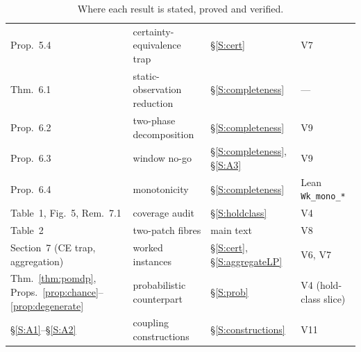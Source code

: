 \begin{table}[htbp]
\begin{tabularx}{\textwidth}{@{}>{\raggedright\arraybackslash}p{}>{\raggedright\arraybackslash}X>{\raggedright\arraybackslash}p{}>{\raggedright\arraybackslash}p{}@{}}
Prop.~5.4 & certainty-equivalence trap & \S\ref{S:cert} & V7\\
Thm.~6.1 & static-observation reduction & \S\ref{S:completeness} & ---\\
Prop.~6.2 & two-phase decomposition & \S\ref{S:completeness} & V9\\
Prop.~6.3 & window no-go & \S\ref{S:completeness}, \S\ref{S:A3} & V9\\
Prop.~6.4 & monotonicity & \S\ref{S:completeness} & Lean \texttt{Wk\_mono\_*}\\
Table~1, Fig.~5, Rem.~7.1 & coverage audit & \S\ref{S:holdclass} & V4\\
Table~2 & two-patch fibres & main text & V8\\
Section~7 (CE trap, aggregation) & worked instances & \S\ref{S:cert}, \S\ref{S:aggregateLP} & V6, V7\\
Thm.~\ref{thm:pomdp}, Props.~\ref{prop:chance}--\ref{prop:degenerate} & probabilistic counterpart & \S\ref{S:prob} & V4 (hold-class slice)\\
\S\ref{S:A1}--\S\ref{S:A2} & coupling constructions & \S\ref{S:constructions} & V11\\
\bottomrule
\end{tabularx}
\caption{Where each result is stated, proved and verified.}
\label{tab:map}
\end{table}

